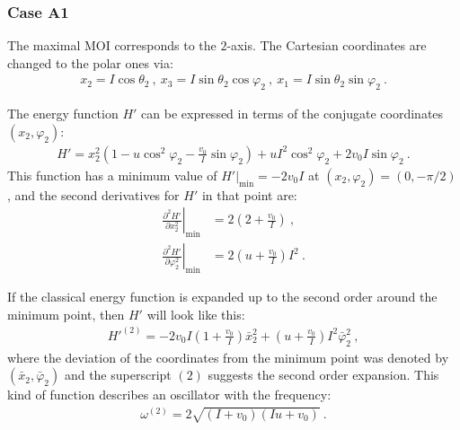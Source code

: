 \subsubsection*{Case A1}

The maximal MOI corresponds to the $2$-axis. The Cartesian coordinates are changed to the polar ones via:
\begin{align}
    x_2=I\cos\theta_2\ ,\ x_3=I\sin\theta_2\cos\varphi_2\ ,\ x_1=I\sin\theta_2\sin\varphi_2\ .
    \label{polar-coordinates-case-a1}
\end{align}

The energy function $H'$ can be expressed in terms of the conjugate coordinates $(x_2,\varphi_2)$:
\begin{align}
    H'=x_2^2\left(1-u\cos^2\varphi_2-\frac{v_0}{I}\sin\varphi_2\right)+uI^2\cos^2\varphi_2+2v_0I\sin\varphi_2\ .
    \label{classical-energy-new-boson-2-axis}
\end{align}
This function has a minimum value of $H'\vert_\text{min}=-2v_0I$ at $(x_2,\varphi_2)=(0,-\pi/2)$, and the second derivatives for $H'$ in that point are:
\begin{align}
    \left.\frac{\partial^2H'}{\partial x_2^2}\right\vert_\text{min}&=2\left(2+\frac{v_0}{I}\right)\ ,\nonumber\\
    \left.\frac{\partial^2 H'}{\partial \varphi_2^2}\right\vert_\text{min}&=2\left(u+\frac{v_0}{I}\right)I^2\ .
\end{align}

If the classical energy function is expanded up to the second order around the minimum point, then $H'$ will look like this:
\begin{align}
    H'^{(2)}=-2v_0I\left(1+\frac{v_0}{I}\right)\bar{x}_2^2+\left(u+\frac{v_0}{I}\right)I^2\bar{\varphi}_2^2\ ,
\end{align}
where the deviation of the coordinates from the minimum point was denoted by $(\bar{x}_2,\bar{\varphi}_2)$ and the superscript $(2)$ suggests the second order expansion. This kind of function describes an oscillator with the frequency:
\begin{align}
    \omega^{(2)}=2\sqrt{(I+v_0)(Iu+v_0)}\ .
\end{align}

